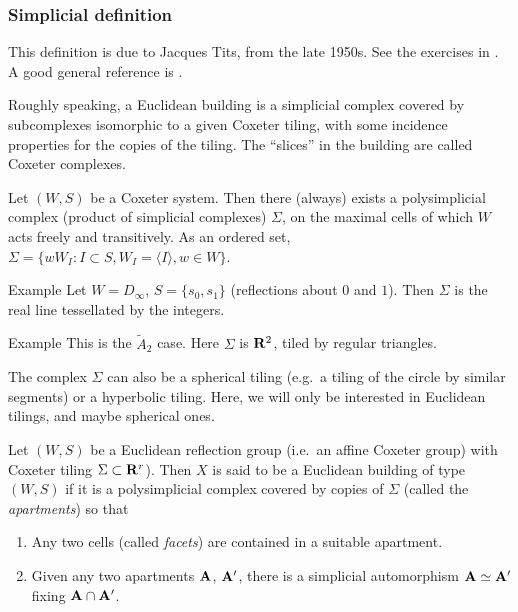 \subsubsection{Simplicial definition}

This definition is due to Jacques Tits, from the late 1950s. See the exercises 
in \cite[IV]{b02}. A good general reference is \cite{ab08}. 

Roughly speaking, a Euclidean building is a simplicial complex covered by 
subcomplexes isomorphic to a given Coxeter tiling, with some incidence 
properties for the copies of the tiling. The ``slices'' in the building are 
called Coxeter complexes. 

Let $(W,S)$ be a Coxeter system. Then there (always) exists a polysimplicial 
complex (product of simplicial complexes) $\Sigma$, on the maximal 
cells of which $W$ acts freely and transitively. As an ordered set, 
$\Sigma=\{w W_I:I\subset S,W_I=\langle I\rangle, w\in W\}$. 

\begin{enonce}[remark]{Example}
Let $W=D_\infty$, $S=\{s_0,s_1\}$ (reflections about $0$ and $1$). Then 
$\Sigma$ is the real line tessellated by the integers. 
\end{enonce}

\begin{enonce}[remark]{Example}
This is the $\widetilde A_2$ case. Here $\Sigma$ is $\mathbf{R}^2$, tiled by regular 
triangles. 
\end{enonce}

The complex $\Sigma$ can also be a spherical tiling (e.g.\ a tiling of the 
circle by similar segments) or a hyperbolic tiling. Here, we will only be 
interested in Euclidean tilings, and maybe spherical ones. 

\begin{defi}
Let $(W,S)$ be a Euclidean reflection group (i.e.\ an affine Coxeter group) with 
Coxeter tiling $\Sigma\subset \mathbf{R}^r$). Then $X$ is said to be a Euclidean 
building of type $(W,S)$ if it is a polysimplicial complex covered by copies of 
$\Sigma$ (called the \emph{apartments}) so that 
\begin{enumerate}
  \item Any two cells (called \emph{facets}) are contained in a suitable apartment. 
  \item Given any two apartments $\mathbf{A}$, $\mathbf{A}'$, there is a simplicial 
    automorphism $\mathbf{A}\simeq \mathbf{A}'$ fixing $\mathbf{A}\cap \mathbf{A}'$. 
\end{enumerate}
\end{defi}

